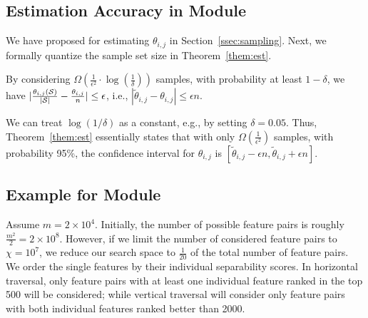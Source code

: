 \subsection{Estimation Accuracy in \sampling Module} \label{app:sampling}
We have proposed \sampling for estimating $\theta_{i,j}$ in Section~\ref{ssec:sampling}. Next, we formally quantize the sample set size in Theorem~\ref{them:est}.

\begin{theorem}\label{them:est}
By considering $\Omega(\frac{1}{\epsilon^2}\cdot \log(\frac{1}{\delta}))$ samples, with probability at least $1-\delta$, we have $|\frac{\theta_{i,j}({\mathcal{S}})}{|{\mathcal{S}}|}-\frac{\theta_{i,j}}{n}| \leq \epsilon$, i.e., $|\tilde{\theta}_{i,j}-\theta_{i,j}|\leq \epsilon n$.
\end{theorem}
\noindent We can treat $\log(1/\delta)$ as a constant, e.g., by setting $\delta = 0.05$. Thus, Theorem~\ref{them:est} essentially states that with only $\Omega(\frac{1}{\epsilon^2})$ samples, with probability 95\%, the confidence interval for $\theta_{i,j}$ is $[\tilde{\theta}_{i,j}-\epsilon n, \tilde{\theta}_{i,j}+\epsilon n]$.


\subsection{Example for \traversal Module} \label{app:trav}
Assume $m=2\times 10^4$. Initially, the number of possible feature pairs is roughly $\frac{m^2}{2}=2\times 10^8$. However, if we limit the number of considered feature pairs to $\chi=10^7$, we reduce our search space to $\frac{1}{20}$ of the total number of feature pairs. We order the single features by their individual separability scores. In horizontal traversal, only feature pairs with at least one individual feature ranked in the top 500 will be considered; while vertical traversal will consider only feature pairs with both individual features ranked better than 2000.


